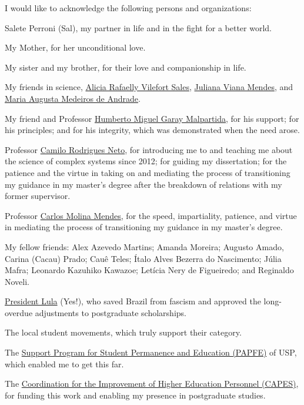 
\begin{agradecimentos}
I would like to acknowledge the following persons and organizations:

Salete Perroni (Sal), my partner in life and in the fight for a better
world.

My Mother, for her unconditional love.

My sister and my brother, for their love and companionship in life.

My friends in science,
\href{https://orcid.org/0000-0003-0004-4487}{Alicia Rafaelly Vilefort
Sales}, \href{https://orcid.org/0000-0002-8222-5240}{Juliana Viana
Mendes}, and \href{https://orcid.org/0000-0002-9283-9967}{Maria Augusta
Medeiros de Andrade}.

My friend and Professor
\href{https://orcid.org/0000-0002-1164-2055}{Humberto Miguel Garay
Malpartida}, for his support; for his principles; and for his integrity,
which was demonstrated when the need arose.

Professor \href{https://orcid.org/0000-0001-6783-6695}{Camilo Rodrigues
Neto}, for introducing me to and teaching me about the science of
complex systems since 2012; for guiding my dissertation; for the
patience and the virtue in taking on and mediating the process of
transitioning my guidance in my master's degree after the breakdown of
relations with my former supervisor.

Professor \href{https://orcid.org/0000-0003-2916-4415}{Carlos Molina
Mendes}, for the speed, impartiality, patience, and virtue in mediating
the process of transitioning my guidance in my master's degree.

My fellow friends: Alex Azevedo Martins; Amanda Moreira; Augusto Amado,
Carina (Cacau) Prado; Cauê Teles; Ítalo Alves Bezerra do Nascimento;
Júlia Mafra; Leonardo Kazuhiko Kawazoe; Letícia Nery de Figueiredo; and
Reginaldo Noveli.

\href{https://lula.com.br/}{President Lula} (Yes!), who saved Brazil
from fascism and approved the long-overdue adjustments to postgraduate
scholarships.

The local student movements, which truly support their category.

The \href{https://prip.usp.br/apoio-estudantil/}{Support Program for
Student Permanence and Education (PAPFE)} of USP, which enabled me to
get this far.

The \href{https://www.gov.br/capes/}{Coordination for the Improvement of
Higher Education Personnel (CAPES)}, for funding this work and enabling
my presence in postgraduate studies.
\end{agradecimentos}


